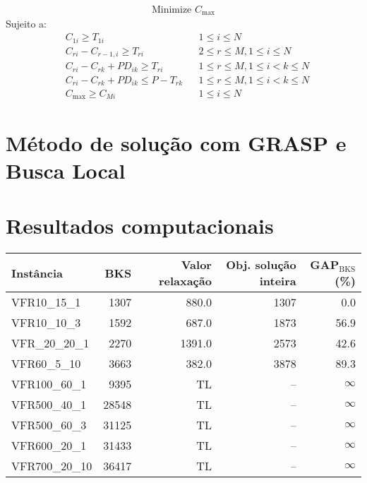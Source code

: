\documentclass[12pt]{article}
\begin{document}
\begin{align}
   \text{Minimize } C_\mathrm{max}
\end{align}
Sujeito a:
\begin{align}
   & C_{1i} \geqslant T_{1i} & & 1 \leqslant i \leqslant N\\
   & C_{ri} - C_{r-1,i} \geqslant T_{ri} & & 2 \leqslant r \leqslant M, 
      1 \leqslant i \leqslant N\\
   & C_{ri} - C_{rk} + PD_{ik} \geqslant T_{ri} & & 1 \leqslant r \leqslant M, 
      1 \leqslant i < k \leqslant N\\
   & C_{ri} - C_{rk} + PD_{ik} \leqslant P - T_{rk} & & 1 \leqslant r \leqslant M, 
      1 \leqslant i < k \leqslant N\\
   & C_\mathrm{max} \geqslant C_{Mi} & & 1 \leqslant i \leqslant N
\end{align}

\section{Método de solução com GRASP e Busca Local}

\section{Resultados computacionais}

\tiny

\normalsize

\begin{table}[ht]
   \begin{tabular}{lrrrr}
      \toprule
      Instância & BKS & Valor relaxação & Obj. solução inteira & GAP$_\mathrm{BKS}$ (\%) \\
      \midrule
      VFR10\_15\_1 & 1307 & 880.0 & 1307 & \phantom{0}0.0\\
      VFR10\_10\_3 & 1592 & 687.0 & 1873 & 56.9\\
      VFR\_20\_20\_1 & 2270 & 1391.0 & 2573 & 42.6\\
      VFR60\_5\_10 & 3663 & 382.0 & 3878 & 89.3\\
      VFR100\_60\_1 & 9395  &  TL & -- & $\infty$\\
      VFR500\_40\_1 & 28548 &  TL & -- & $\infty$\\
      VFR500\_60\_3 & 31125 &  TL & -- & $\infty$\\
      VFR600\_20\_1 & 31433 &  TL & -- & $\infty$\\
      VFR700\_20\_10 & 36417 & TL & -- & $\infty$\\ 
      \bottomrule
   \end{tabular}
\end{table}
\end{document}
